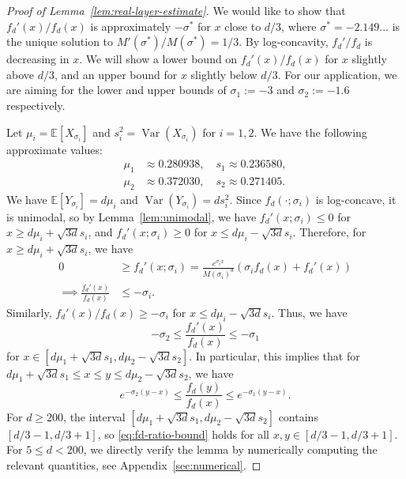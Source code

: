 \documentclass{article}
\newcommand{\EE}{\mathbb{E}}
\theoremstyle{definition}
\DeclareMathOperator{\Var}{Var}
\begin{document}
\begin{proof}[Proof of Lemma~\ref{lem:real-layer-estimate}]
    We would like to show that $f_d'(x)/f_d(x)$ is approximately $-\sigma^*$ for $x$ close to $d/3$, where $\sigma^*=-2.149...$ is the unique solution to $M'(\sigma^*)/M(\sigma^*)=1/3$. By log-concavity, $f_d'/f_d$ is decreasing in $x$. We will show a lower bound on $f_d'(x)/f_d(x)$ for $x$ slightly above $d/3$, and an upper bound for $x$ slightly below $d/3$. For our application, we are aiming for the lower and upper bounds of $\sigma_1:=-3$ and $\sigma_2:=-1.6$ respectively.

    Let $\mu_i=\EE[X_{\sigma_i}]$ and $s_i^2=\Var(X_{\sigma_i})$ for $i=1,2$. We have the following approximate values:
    \begin{align*}
        \mu_1 &\approx 0.280938, \quad s_1 \approx 0.236580, \\
        \mu_2 &\approx 0.372030, \quad s_2 \approx 0.271405.
    \end{align*}
    We have $\EE[Y_{\sigma_i}] = d\mu_i$ and $\Var(Y_{\sigma_i}) = d s_i^2$. Since $f_d(\cdot;\sigma_i)$ is log-concave, it is unimodal, so by Lemma~\ref{lem:unimodal}, we have $f_d'(x;\sigma_i)\leq 0$ for $x\geq d\mu_i + \sqrt{3d} s_i$, and $f_d'(x;\sigma_i)\geq 0$ for $x\leq d\mu_i - \sqrt{3d} s_i$. Therefore, for $x\geq d\mu_i + \sqrt{3d} s_i$, we have
    \begin{align*}
        0 &\geq f_d'(x;\sigma_i) = \frac{e^{\sigma_i x}}{M(\sigma_i)^d}(\sigma_i f_d(x) + f_d'(x)) \\
        \implies \frac{f_d'(x)}{f_d(x)} &\leq -\sigma_i.
    \end{align*}
    Similarly, $f_d'(x)/f_d(x)\geq -\sigma_i$ for $x\leq d\mu_i - \sqrt{3d} s_i$. Thus, we have
    \[-\sigma_2 \leq \frac{f_d'(x)}{f_d(x)} \leq -\sigma_1\]
    for $x\in [d\mu_1 + \sqrt{3d} s_1, d\mu_2 - \sqrt{3d} s_2]$. In particular, this implies that for $d\mu_1 + \sqrt{3d} s_1 \leq x\leq y\leq d\mu_2 - \sqrt{3d} s_2$, we have
    \begin{equation} \label{eq:fd-ratio-bound}
        e^{-\sigma_2(y-x)} \leq \frac{f_d(y)}{f_d(x)} \leq e^{-\sigma_1(y-x)}.
    \end{equation}
    For $d\geq 200$, the interval $[d\mu_1 + \sqrt{3d} s_1, d\mu_2 - \sqrt{3d} s_2]$ contains $[d/3-1, d/3+1]$, so \eqref{eq:fd-ratio-bound} holds for all $x,y\in [d/3-1, d/3+1]$. For $5\leq d < 200$, we directly verify the lemma by numerically computing the relevant quantities, see Appendix~\ref{sec:numerical}.


\end{proof}
\end{document}
